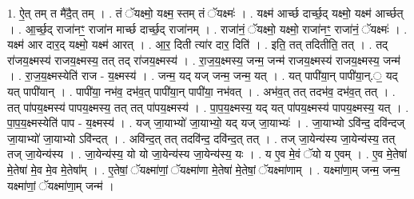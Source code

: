 \documentclass[17pt]{extarticle}
\begin{document}
1. ऐ॒त् तम् त मै॑दै॒त् तम् । . तं ॅयक्ष्मो॒ यक्ष्म॒ स्तम् तं ॅयक्ष्मः॑ । . यक्ष्म॑ आर्च्छ दार्च्छ॒द् यक्ष्मो॒ यक्ष्म॑ आर्च्छत् । . आ॒र्च्छ॒द् राजा॑नꣳ॒॒ राजा॑न मार्च्छ दार्च्छ॒द् राजा॑नम् । . राजा॑नं॒ ॅयक्ष्मो॒ यक्ष्मो॒ राजा॑नꣳ॒॒ राजा॑नं॒ ॅयक्ष्मः॑ । . यक्ष्म॑ आर दार॒द् यक्ष्मो॒ यक्ष्म॑ आरत् । . आ॒र॒ दिती त्या॑र दार॒ दिति॑ । . इति॒ तत् तदितीति॒ तत् । . तद् रा॑जय॒क्ष्मस्य॑ राजय॒क्ष्मस्य॒ तत् तद् रा॑जय॒क्ष्मस्य॑ । . रा॒ज॒य॒क्ष्मस्य॒ जन्म॒ जन्म॑ राजय॒क्ष्मस्य॑ राजय॒क्ष्मस्य॒ जन्म॑ । . रा॒ज॒य॒क्ष्मस्येति॑ राज - य॒क्ष्मस्य॑ । . जन्म॒ यद् यज् जन्म॒ जन्म॒ यत् । . यत् पापी॑या॒न् पापी॑या॒न्.॒ यद् यत् पापी॑यान् । . पापी॑या॒ नभ॑व॒ दभ॑व॒त् पापी॑या॒न् पापी॑या॒ नभ॑वत् । . अभ॑व॒त् तत् तदभ॑व॒ दभ॑व॒त् तत् । . तत् पा॑पय॒क्ष्मस्य॑ पापय॒क्ष्मस्य॒ तत् तत् पा॑पय॒क्ष्मस्य॑ । . पा॒प॒य॒क्ष्मस्य॒ यद् यत् पा॑पय॒क्ष्मस्य॑ पापय॒क्ष्मस्य॒ यत् । . पा॒प॒य॒क्ष्मस्येति॑ पाप - य॒क्ष्मस्य॑ । . यज् जा॒याभ्यो॑ जा॒याभ्यो॒ यद् यज् जा॒याभ्यः॑ । . जा॒याभ्यो ऽवि॑न्द॒ दवि॑न्दज् जा॒याभ्यो॑ जा॒याभ्यो ऽवि॑न्दत् । . अवि॑न्द॒त् तत् तदवि॑न्द॒ दवि॑न्द॒त् तत् । . तज् जा॒येन्य॑स्य जा॒येन्य॑स्य॒ तत् तज् जा॒येन्य॑स्य । . जा॒येन्य॑स्य॒ यो यो जा॒येन्य॑स्य जा॒येन्य॑स्य॒ यः । . य ए॒व मे॒वं ॅयो य ए॒वम् । . ए॒व मे॒तेषा॑ मे॒तेषा॑ मे॒व मे॒व मे॒तेषा᳚म् । . ए॒तेषां॒ ॅयक्ष्मा॑णां॒ ॅयक्ष्मा॑णा मे॒तेषा॑ मे॒तेषां॒ ॅयक्ष्मा॑णाम् । . यक्ष्मा॑णा॒म् जन्म॒ जन्म॒ यक्ष्मा॑णां॒ ॅयक्ष्मा॑णा॒म् जन्म॑ । \newline
\end{document}
